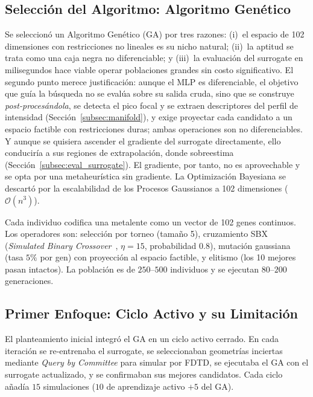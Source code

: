 \subsection{Selección del Algoritmo: Algoritmo Genético}\label{subsec:seleccion_ga}

Se seleccionó un Algoritmo Genético (GA) por tres razones: (i)~el espacio de 102 dimensiones con restricciones no lineales es su nicho natural; (ii)~la aptitud se trata como una caja negra no diferenciable; y (iii)~la evaluación del surrogate en milisegundos hace viable operar poblaciones grandes sin costo significativo. El segundo punto merece justificación: aunque el MLP es diferenciable, el objetivo que guía la búsqueda no se evalúa sobre su salida cruda, sino que se construye \emph{post-procesándola}, se detecta el pico focal y se extraen descriptores del perfil de intensidad (Sección~\ref{subsec:manifold}), y exige proyectar cada candidato a un espacio factible con restricciones duras; ambas operaciones son no diferenciables. Y aunque se quisiera ascender el gradiente del surrogate directamente, ello conduciría a sus regiones de extrapolación, donde sobreestima (Sección~\ref{subsec:eval_surrogate}). El gradiente, por tanto, no es aprovechable y se opta por una metaheurística sin gradiente. La Optimización Bayesiana se descartó por la escalabilidad de los Procesos Gaussianos a 102 dimensiones ($\mathcal{O}(n^3)$).

Cada individuo codifica una metalente como un vector de 102 genes continuos. Los operadores son: selección por torneo (tamaño 5), cruzamiento SBX (\textit{Simulated Binary Crossover}~\cite{deb1995sbx}, $\eta = 15$, probabilidad $0.8$), mutación gaussiana (tasa $5\%$ por gen) con proyección al espacio factible, y elitismo (los 10 mejores pasan intactos). La población es de $250$--$500$ individuos y se ejecutan $80$--$200$ generaciones.

\subsection{Primer Enfoque: Ciclo Activo y su Limitación}\label{subsec:ciclo_activo}

El planteamiento inicial integró el GA en un ciclo activo cerrado. En cada iteración se re-entrenaba el surrogate, se seleccionaban geometrías inciertas mediante \textit{Query by Committee} para simular por FDTD, se ejecutaba el GA con el surrogate actualizado, y se confirmaban sus mejores candidatos. Cada ciclo añadía $15$ simulaciones ($10$ de aprendizaje activo $+ 5$ del GA).

